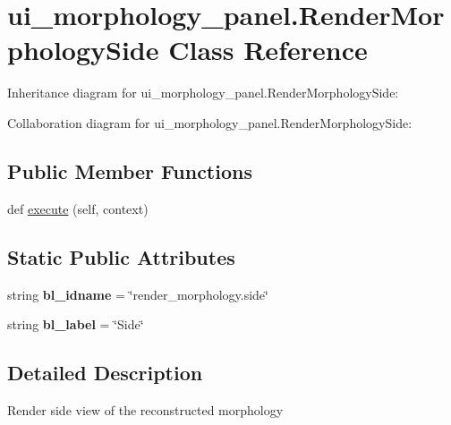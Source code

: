 \hypertarget{classui__morphology__panel_1_1RenderMorphologySide}{}\section{ui\+\_\+morphology\+\_\+panel.\+Render\+Morphology\+Side Class Reference}
\label{classui__morphology__panel_1_1RenderMorphologySide}


Inheritance diagram for ui\+\_\+morphology\+\_\+panel.\+Render\+Morphology\+Side\+:


Collaboration diagram for ui\+\_\+morphology\+\_\+panel.\+Render\+Morphology\+Side\+:
\subsection*{Public Member Functions}
\begin{DoxyCompactItemize}
\item 
def \hyperlink{classui__morphology__panel_1_1RenderMorphologySide_a5c26c3e32f54a14532192b80dd5b7d9c}{execute} (self, context)
\end{DoxyCompactItemize}
\subsection*{Static Public Attributes}
\begin{DoxyCompactItemize}
\item 
string {\bfseries bl\+\_\+idname} = \char`\"{}render\+\_\+morphology.\+side\char`\"{}\hypertarget{classui__morphology__panel_1_1RenderMorphologySide_ad75d3c355c9a76de5691ecb6a21c5a21}{}\label{classui__morphology__panel_1_1RenderMorphologySide_ad75d3c355c9a76de5691ecb6a21c5a21}

\item 
string {\bfseries bl\+\_\+label} = \char`\"{}Side\char`\"{}\hypertarget{classui__morphology__panel_1_1RenderMorphologySide_af230f98262ec748bd5dac7ce792de7ea}{}\label{classui__morphology__panel_1_1RenderMorphologySide_af230f98262ec748bd5dac7ce792de7ea}

\end{DoxyCompactItemize}


\subsection{Detailed Description}
\begin{DoxyVerb}Render side view of the reconstructed morphology\end{DoxyVerb}
 

